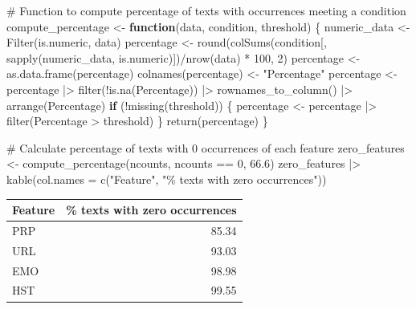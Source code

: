 \documentclass[
  letterpaper,
  DIV=11,
  numbers=noendperiod]{scrreprt}
\newenvironment{Shaded}{\begin{snugshade}}{\end{snugshade}}
\newcommand{\AttributeTok}[1]{\textcolor[rgb]{0.40,0.45,0.13}{#1}}
\newcommand{\CommentTok}[1]{\textcolor[rgb]{0.37,0.37,0.37}{#1}}
\newcommand{\ControlFlowTok}[1]{\textcolor[rgb]{0.00,0.23,0.31}{\textbf{#1}}}
\newcommand{\DecValTok}[1]{\textcolor[rgb]{0.68,0.00,0.00}{#1}}
\newcommand{\FloatTok}[1]{\textcolor[rgb]{0.68,0.00,0.00}{#1}}
\newcommand{\FunctionTok}[1]{\textcolor[rgb]{0.28,0.35,0.67}{#1}}
\newcommand{\NormalTok}[1]{\textcolor[rgb]{0.00,0.23,0.31}{#1}}
\newcommand{\OtherTok}[1]{\textcolor[rgb]{0.00,0.23,0.31}{#1}}
\newcommand{\SpecialCharTok}[1]{\textcolor[rgb]{0.37,0.37,0.37}{#1}}
\newcommand{\StringTok}[1]{\textcolor[rgb]{0.13,0.47,0.30}{#1}}
\begin{document}
\begin{Shaded}
\begin{Highlighting}[]
\CommentTok{\# Function to compute percentage of texts with occurrences meeting a condition}
\NormalTok{compute\_percentage }\OtherTok{\textless{}{-}} \ControlFlowTok{function}\NormalTok{(data, condition, threshold) \{}
\NormalTok{  numeric\_data }\OtherTok{\textless{}{-}} \FunctionTok{Filter}\NormalTok{(is.numeric, data)}
\NormalTok{  percentage }\OtherTok{\textless{}{-}} \FunctionTok{round}\NormalTok{(}\FunctionTok{colSums}\NormalTok{(condition[, }\FunctionTok{sapply}\NormalTok{(numeric\_data, is.numeric)])}\SpecialCharTok{/}\FunctionTok{nrow}\NormalTok{(data) }\SpecialCharTok{*} \DecValTok{100}\NormalTok{, }\DecValTok{2}\NormalTok{)}
\NormalTok{  percentage }\OtherTok{\textless{}{-}} \FunctionTok{as.data.frame}\NormalTok{(percentage)}
  \FunctionTok{colnames}\NormalTok{(percentage) }\OtherTok{\textless{}{-}} \StringTok{"Percentage"}
\NormalTok{  percentage }\OtherTok{\textless{}{-}}\NormalTok{ percentage }\SpecialCharTok{|\textgreater{}} 
    \FunctionTok{filter}\NormalTok{(}\SpecialCharTok{!}\FunctionTok{is.na}\NormalTok{(Percentage)) }\SpecialCharTok{|\textgreater{}}
    \FunctionTok{rownames\_to\_column}\NormalTok{() }\SpecialCharTok{|\textgreater{}}
    \FunctionTok{arrange}\NormalTok{(Percentage)}
  \ControlFlowTok{if}\NormalTok{ (}\SpecialCharTok{!}\FunctionTok{missing}\NormalTok{(threshold)) \{}
\NormalTok{    percentage }\OtherTok{\textless{}{-}}\NormalTok{ percentage }\SpecialCharTok{|\textgreater{}} 
      \FunctionTok{filter}\NormalTok{(Percentage }\SpecialCharTok{\textgreater{}}\NormalTok{ threshold)}
\NormalTok{  \}}
  \FunctionTok{return}\NormalTok{(percentage)}
\NormalTok{\}}

\CommentTok{\# Calculate percentage of texts with 0 occurrences of each feature}
\NormalTok{zero\_features }\OtherTok{\textless{}{-}} \FunctionTok{compute\_percentage}\NormalTok{(ncounts, ncounts }\SpecialCharTok{==} \DecValTok{0}\NormalTok{, }\FloatTok{66.6}\NormalTok{)}
\NormalTok{zero\_features }\SpecialCharTok{|\textgreater{}} 
  \FunctionTok{kable}\NormalTok{(}\AttributeTok{col.names =} \FunctionTok{c}\NormalTok{(}\StringTok{"Feature"}\NormalTok{, }\StringTok{"\% texts with zero occurrences"}\NormalTok{))}
\end{Highlighting}
\end{Shaded}

\begin{longtable}[]{@{}lr@{}}
\toprule\noalign{}
Feature & \% texts with zero occurrences \\
\midrule\noalign{}
\endhead
\bottomrule\noalign{}
\endlastfoot
PRP & 85.34 \\
URL & 93.03 \\
EMO & 98.98 \\
HST & 99.55 \\
\end{longtable}
\end{document}
